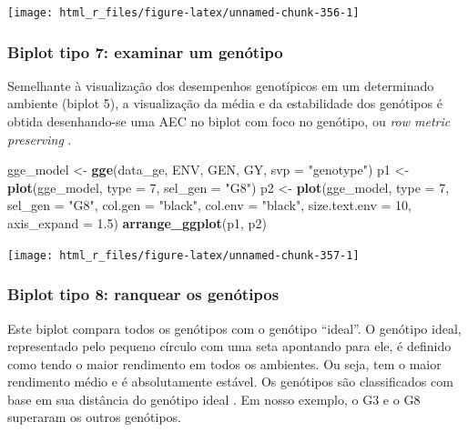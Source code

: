 \documentclass[
]{book}
\newenvironment{Shaded}{\begin{snugshade}}{\end{snugshade}}
\newcommand{\DataTypeTok}[1]{\textcolor[rgb]{0.13,0.29,0.53}{#1}}
\newcommand{\DecValTok}[1]{\textcolor[rgb]{0.00,0.00,0.81}{#1}}
\newcommand{\FloatTok}[1]{\textcolor[rgb]{0.00,0.00,0.81}{#1}}
\newcommand{\KeywordTok}[1]{\textcolor[rgb]{0.13,0.29,0.53}{\textbf{#1}}}
\newcommand{\NormalTok}[1]{#1}
\newcommand{\StringTok}[1]{\textcolor[rgb]{0.31,0.60,0.02}{#1}}
\begin{document}
\begin{center}\texttt{[image: html\_r\_files/figure-latex/unnamed-chunk-356-1]} \end{center}

\hypertarget{biplot-tipo-7-examinar-um-genuxf3tipo}{%
\subsubsection{Biplot tipo 7: examinar um genótipo}\label{biplot-tipo-7-examinar-um-genuxf3tipo}}

Semelhante à visualização dos desempenhos genotípicos em um determinado ambiente (biplot 5), a visualização da média e da estabilidade dos genótipos é obtida desenhando-se uma AEC no biplot com foco no genótipo, ou \emph{row metric preserving} \citep{Yan2007}.

\begin{Shaded}
\begin{Highlighting}[]
\NormalTok{gge_model <-}\StringTok{ }\KeywordTok{gge}\NormalTok{(data_ge, ENV, GEN, GY, }\DataTypeTok{svp =} \StringTok{"genotype"}\NormalTok{)}
\NormalTok{p1 <-}\StringTok{ }\KeywordTok{plot}\NormalTok{(gge_model, }\DataTypeTok{type =} \DecValTok{7}\NormalTok{, }\DataTypeTok{sel_gen =} \StringTok{"G8"}\NormalTok{)}
\NormalTok{p2 <-}\StringTok{ }\KeywordTok{plot}\NormalTok{(gge_model,}
           \DataTypeTok{type =} \DecValTok{7}\NormalTok{,}
           \DataTypeTok{sel_gen =} \StringTok{"G8"}\NormalTok{,}
           \DataTypeTok{col.gen =} \StringTok{"black"}\NormalTok{,}
           \DataTypeTok{col.env =} \StringTok{"black"}\NormalTok{,}
           \DataTypeTok{size.text.env =} \DecValTok{10}\NormalTok{,}
           \DataTypeTok{axis_expand =} \FloatTok{1.5}\NormalTok{)}
\KeywordTok{arrange_ggplot}\NormalTok{(p1, p2)}
\end{Highlighting}
\end{Shaded}

\begin{center}\texttt{[image: html\_r\_files/figure-latex/unnamed-chunk-357-1]} \end{center}

\hypertarget{biplot-tipo-8-ranquear-os-genuxf3tipos}{%
\subsubsection{Biplot tipo 8: ranquear os genótipos}\label{biplot-tipo-8-ranquear-os-genuxf3tipos}}

Este biplot compara todos os genótipos com o genótipo ``ideal''. O genótipo ideal, representado pelo pequeno círculo com uma seta apontando para ele, é definido como tendo o maior rendimento em todos os ambientes. Ou seja, tem o maior rendimento médio e é absolutamente estável. Os genótipos são classificados com base em sua distância do genótipo ideal \citep{Yan2007}. Em nosso exemplo, o G3 e o G8 superaram os outros genótipos.
\end{document}
